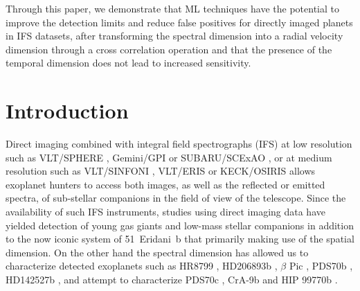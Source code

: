 \documentclass{aa}
\begin{document}
  {Through this paper, we demonstrate that ML techniques have the potential to improve the detection limits and reduce false positives for directly imaged planets in IFS datasets, after transforming the spectral dimension into a radial velocity dimension through a cross correlation operation and that the presence of the temporal dimension does not lead to increased sensitivity.
  }
   

\maketitle
%

\section{Introduction}

Direct imaging combined with integral field spectrographs (IFS) at low resolution such as VLT/SPHERE \citep{2019Beuzit}, Gemini/GPI \citep{2014MacintoshGPI} or SUBARU/SCExAO \citep{2015SCeXAO}, or at medium resolution such as VLT/SINFONI \citep{2004SINFONI}, VLT/ERIS \citep{2023Davies} or KECK/OSIRIS \citep{2000OSIRIS} allows exoplanet hunters to access both images, as well as the reflected or emitted spectra, of sub-stellar companions in the field of view of the telescope.
Since the availability of such IFS instruments, studies using direct imaging data have yielded detection of young gas giants \citep[e.g., PDS70b, ][]{2018KepplerPDS70} and low-mass stellar companions \citep[e.g., HD142527b, ][]{2019ClaudiHD142527b} in addition to the now iconic system of 51~Eridani~b \citep{2015MacintoshEridani} that primarily making use of the spatial dimension.
On the other hand the spectral dimension has allowed us to characterize detected exoplanets such as HR8799 \citep[e.g][]{2008Marois, 2013Konopacky}, HD206893b \citep[][]{2017DelormeHD206893b}, $\beta$ Pic \citep[][]{2017ChilcoteBetapic}, PDS70b \citep[e.g][]{2018MullerPDS70,2019ChristiaensPDS70}, HD142527b \citep[][]{2018A&ChristiaensHD142527}, and attempt to characterize PDS70c \citep[][]{2019MesaPDS70}, CrA-9b \citep[][]{2021ChristiaensCrA-9b} and HIP 99770b \citep[][]{2023Currie}.
\end{document}
